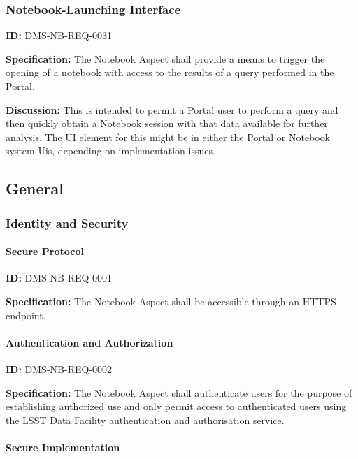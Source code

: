\documentclass[SE,toc,lsstdraft]{lsstdoc}
\begin{document}
\subsubsection{Notebook-Launching Interface}

\label{DMS-NB-REQ-0031}
\textbf{ID:} DMS-NB-REQ-0031

\textbf{Specification:}
The Notebook Aspect shall provide a means to trigger the opening of a notebook with access to the results of a query performed in the Portal.

\textbf{Discussion:}
This is intended to permit a Portal user to perform a query and then quickly obtain a Notebook session with that data available for further analysis.  The UI element for this might be in either the Portal or Notebook system Uis, depending on implementation issues.

\subsection{General}

\subsubsection{Identity and Security}

\paragraph{Secure Protocol}\hfill  %

\label{DMS-NB-REQ-0001}
\textbf{ID:} DMS-NB-REQ-0001

\textbf{Specification:}
The Notebook Aspect shall be accessible through an HTTPS endpoint.

\paragraph{Authentication and Authorization}\hfill  %

\label{DMS-NB-REQ-0002}
\textbf{ID:} DMS-NB-REQ-0002

\textbf{Specification:}
The Notebook Aspect shall authenticate users for the purpose of establishing authorized use and only permit access to authenticated users using the LSST Data Facility authentication and authorisation service.

\paragraph{Secure Implementation}\hfill  %
\end{document}
